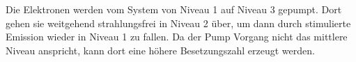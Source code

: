 Die Elektronen werden vom System von Niveau 1 auf Niveau 3 gepumpt. 
Dort gehen sie weitgehend strahlungsfrei in Niveau 2 über, 
um dann durch stimulierte Emission wieder in Niveau 1 zu fallen.
Da der Pump Vorgang nicht das mittlere Niveau anspricht,
kann dort eine höhere Besetzungszahl erzeugt werden. 
